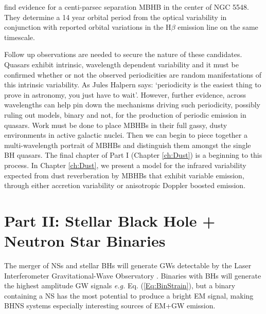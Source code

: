 \cite{LiWang:2016} find evidence for a centi-parsec separation MBHB in the
center of NGC 5548. They determine a 14 year orbital period from the optical
variability in conjunction with reported orbital variations in the H$\beta$
emission line on the same timescale.



Follow up observations are needed to secure the nature of these candidates.
Quasars exhibit intrinsic, wavelength dependent variability
\citep{Kelly:2009:DRW,Kozlowski+2010} and it must be confirmed whether or not
the observed periodicities are random manifestations of this intrinsic
variability. As Jules Halpern says: `periodicity is the easiest thing to prove
in astronomy, you just have to wait'. However, further evidence, across
wavelengths can help pin down the mechanisms driving such periodicity,
possibly ruling out models, binary and not, for the production of periodic
emission in quasars. Work must be done to place MBHBs in their full gassy,
dusty environments in active galactic nuclei. Then we can begin to piece
together a multi-wavelength portrait of MBHBs and distinguish them amongst the
single BH quasars. The final chapter of Part I (Chapter \ref{ch:Dust}) is a
beginning to this process. In Chapter \ref{ch:Dust}, we present a model for
the infrared variability expected from dust reverberation by MBHBs that
exhibit variable emission, through either accretion variability or anisotropic
Doppler boosted emission.




































\section{Part II: Stellar Black Hole + Neutron Star Binaries}

The merger of NSs and stellar BHs will generate GWs detectable by the Laser
Interferometer Gravitational-Wave Observatory \citep[LIGO][]{aLIGO:2015}.
Binaries with BHs will generate the highest amplitude GW signals \textit{e.g.}
Eq. (\ref{Eq:BinStrain}), but a binary containing a NS has the most potential to
produce a bright EM signal, making BHNS systems especially interesting sources
of EM+GW emission.


